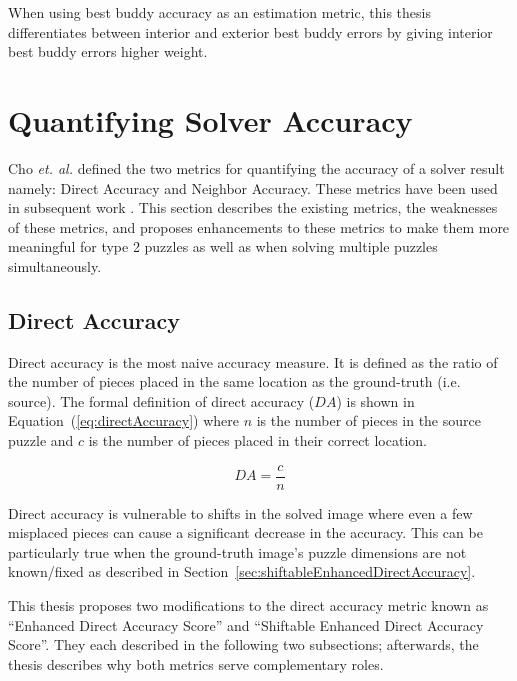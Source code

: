 \documentclass{report}
\def\eref#1{(\ref{#1})}
\begin{document}
When using best buddy accuracy as an estimation metric, this thesis differentiates between interior and exterior best buddy errors by giving interior best buddy errors higher weight.

\pagebreak
\section{Quantifying Solver Accuracy}\label{sec:quantifyingSolverAccuracy}

Cho \textit{et. al.} \cite{cho2010} defined the two metrics for quantifying the accuracy of a solver result namely: Direct Accuracy and Neighbor Accuracy. These metrics have been used in subsequent work \cite{sholomon2013, pomeranz2011, paikin2015, son2014, gallagher2012}.  This section describes the existing metrics, the weaknesses of these metrics, and proposes enhancements to these metrics to make them more meaningful for type 2 puzzles as well as when solving multiple puzzles simultaneously.

\subsection{Direct Accuracy}\label{sec:directAccuracy}

Direct accuracy is the most naive accuracy measure.  It is defined as the ratio of the number of pieces placed in the same location as the ground-truth (i.e. source).  The formal definition of direct accuracy ($DA$) is shown in Equation~\eref{eq:directAccuracy} where $n$ is the number of pieces in the source puzzle and $c$ is the number of pieces placed in their correct location.

\begin{equation} \label{eq:directAccuracy}
DA = \frac{c}{n}
\end{equation}

Direct accuracy is vulnerable to shifts in the solved image where even a few misplaced pieces can cause a significant decrease in the accuracy.  This can be particularly true when the ground-truth image's puzzle dimensions are not known/fixed as described in Section~\ref{sec:shiftableEnhancedDirectAccuracy}.

This thesis proposes two modifications to the direct accuracy metric known as ``Enhanced Direct Accuracy Score'' and ``Shiftable Enhanced Direct Accuracy Score''.  They each described in the following two subsections; afterwards, the thesis describes why both metrics serve complementary roles.
\end{document}
